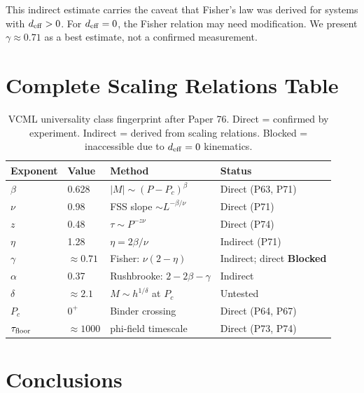 \documentclass[11pt,a4paper]{article}
\begin{document}
This indirect estimate carries the caveat that Fisher's law was derived for systems
with $d_{\rm eff} > 0$.  For $d_{\rm eff} = 0$, the Fisher relation may need
modification.  We present $\gamma \approx 0.71$ as a best estimate, not a confirmed
measurement.

\section{Complete Scaling Relations Table}

\begin{table}[h!]
\centering
\caption{VCML universality class fingerprint after Paper 76.
  Direct = confirmed by experiment. Indirect = derived from scaling relations.
  Blocked = inaccessible due to $d_{\rm eff}=0$ kinematics.}
\begin{tabular}{llll}
\toprule
Exponent & Value & Method & Status \\
\midrule
$\beta$           & 0.628    & $|M| \sim (P - P_c)^\beta$ & Direct (P63, P71) \\
$\nu$             & 0.98     & FSS slope $\sim L^{-\beta/\nu}$ & Direct (P71) \\
$z$               & 0.48     & $\tau \sim P^{-z\nu}$ & Direct (P74) \\
$\eta$            & 1.28     & $\eta = 2\beta/\nu$ & Indirect (P71) \\
$\gamma$          & $\approx 0.71$ & Fisher: $\nu(2-\eta)$ & Indirect; direct \textbf{Blocked} \\
$\alpha$          & 0.37     & Rushbrooke: $2 - 2\beta - \gamma$ & Indirect \\
$\delta$          & $\approx 2.1$ & $M \sim h^{1/\delta}$ at $P_c$ & Untested \\
$P_c$             & $0^+$    & Binder crossing & Direct (P64, P67) \\
$\tau_{\rm floor}$ & $\approx 1000$ & phi-field timescale & Direct (P73, P74) \\
\bottomrule
\end{tabular}
\end{table}

\section{Conclusions}
\end{document}
